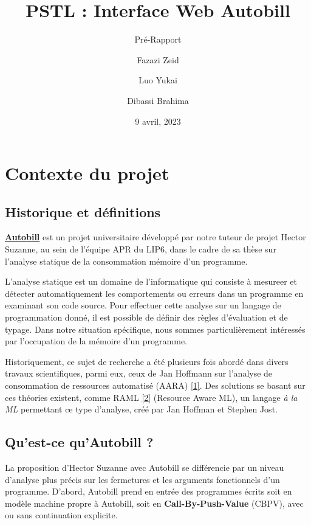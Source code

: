 \documentclass[
  12pt,
]{article}
\title{PSTL : Interface Web Autobill}
\subtitle{Pré-Rapport}
\author{Fazazi Zeid \and Luo Yukai \and Dibassi Brahima}
\date{9 avril, 2023}
\begin{document}
\maketitle

{
\hypersetup{linkcolor=}
\setcounter{tocdepth}{3}
\tableofcontents
}
\hypertarget{contexte-du-projet}{%
\section{Contexte du projet}\label{contexte-du-projet}}

\hypertarget{historique-et-duxe9finitions}{%
\subsection{Historique et
définitions}\label{historique-et-duxe9finitions}}

\href{https://gitlab.lip6.fr/suzanneh/autobill}{\textbf{Autobill}} est
un projet universitaire développé par notre tuteur de projet Hector
Suzanne, au sein de l'équipe APR du LIP6, dans le cadre de sa thèse sur
l'analyse statique de la consommation mémoire d'un programme.

L'analyse statique est un domaine de l'informatique qui consiste à
mesureer et détecter automatiquement les comportements ou erreurs dans
un programme en examinant son code source. Pour effectuer cette analyse
sur un langage de programmation donné, il est possible de définir des
règles d'évaluation et de typage. Dans notre situation spécifique, nous
sommes particulièrement intéressés par l'occupation de la mémoire d'un
programme.

Historiquement, ce sujet de recherche a été plusieurs fois abordé dans
divers travaux scientifiques, parmi eux, ceux de Jan Hoffmann sur
l'analyse de consommation de ressources automatisé (AARA)
\protect\hyperlink{biblio}{{[}1{]}}. Des solutions se basant sur ces
théories existent, comme RAML \protect\hyperlink{biblio}{{[}2{]}}
(Resource Aware ML), un langage \emph{à la ML} permettant ce type
d'analyse, créé par Jan Hoffman et Stephen Jost.

\hypertarget{quest-ce-quautobill}{%
\subsection{Qu'est-ce qu'Autobill ?}\label{quest-ce-quautobill}}

La proposition d'Hector Suzanne avec Autobill se différencie par un
niveau d'analyse plus précis sur les fermetures et les arguments
fonctionnels d'un programme. D'abord, Autobill prend en entrée des
programmes écrits soit en modèle machine propre à Autobill, soit en
\textbf{Call-By-Push-Value} (CBPV), avec ou sans continuation explicite.
\end{document}
